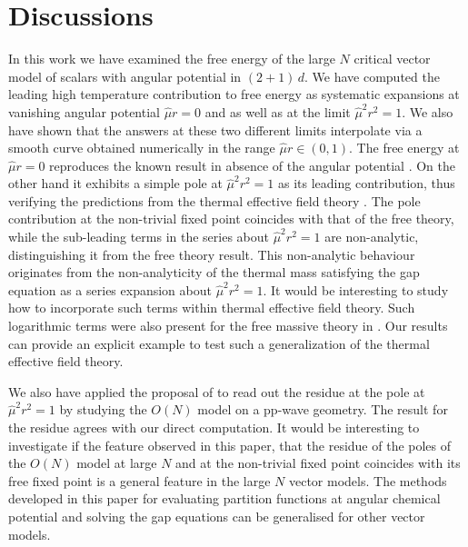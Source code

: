 \documentclass[a4paper,11pt]{article}
\begin{document}
\section{Discussions}
\label{sec:conclusions}
In this work we have examined the free energy of the large $N$ critical vector model of scalars with angular potential in $(2+1)\, d$. We have computed the leading high temperature contribution to free energy as systematic  expansions at  vanishing angular potential $\hat\mu r=0$ and as well as at the limit $\hat\mu^2 r^2 =1$. We also have shown that the answers at these two different limits interpolate via a smooth curve obtained numerically in the range $\hat\mu r\in (0,1)$.
The free energy at $\hat\mu r=0$ reproduces the known result in absence of the angular potential \cite{Sachdev:1993pr}. 
On the other hand it exhibits a simple pole at $\hat\mu^2r^2=1$ as its  leading contribution, thus verifying the predictions from the thermal effective field theory \cite{Anand:2025mfh}. 
The pole contribution at  the non-trivial fixed point coincides with that of the free theory, while the sub-leading terms in the series about $\hat\mu^2r^2=1$ are non-analytic, distinguishing it from the free theory result.  This non-analytic behaviour originates from the non-analyticity of the thermal mass satisfying the gap equation as a series expansion about $\hat\mu^2r^2=1$.  
It would be interesting to study how to incorporate such terms within thermal effective field theory.  
Such logarithmic terms were also present for the free massive theory
in \cite{Anand:2025mfh}.
Our results can provide an explicit example to test such a generalization of  the thermal effective field theory.


We also have applied the proposal of \cite{Komargodski:2026ain} to read out the residue at the pole at $\hat\mu^2r^2=1$
by studying the $O(N)$ model  on a pp-wave geometry.  The result for the residue agrees with our 
direct computation. It would be interesting to investigate if the feature observed in this paper, that 
the residue of the poles of the   $O(N)$ model   at large $N$ and 
at the non-trivial fixed point coincides with its free fixed point   is a general feature in the large $N$ vector models. 
The methods developed in this paper for evaluating partition functions  at angular 
chemical potential  and solving the gap equations can be generalised for other vector models. 
\end{document}
